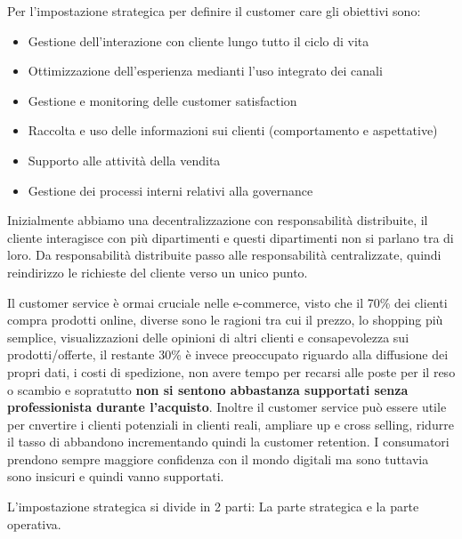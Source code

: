 \documentclass[11pt]{article}
\begin{document}
Per l'impostazione strategica per definire il customer care gli obiettivi sono:
\begin{itemize}[noitemsep,topsep=0ex]
	\item Gestione dell'interazione con cliente lungo tutto il ciclo di vita
	\item Ottimizzazione dell'esperienza medianti l'uso integrato dei canali
	\item Gestione e monitoring delle customer satisfaction
	\item Raccolta e uso delle informazioni sui clienti (comportamento e aspettative)
	\item Supporto alle attività della vendita
	\item Gestione dei processi interni relativi alla governance
\end{itemize}
Inizialmente abbiamo una decentralizzazione con responsabilità distribuite, il cliente interagisce con più dipartimenti e questi dipartimenti non si parlano tra di loro. 
Da responsabilità distribuite passo alle responsabilità centralizzate, quindi reindirizzo le richieste del cliente verso un unico punto.

Il customer service è ormai cruciale nelle e-commerce, visto che il 70\% dei clienti compra prodotti online, diverse sono le ragioni tra cui il prezzo, lo shopping più semplice, visualizzazioni delle opinioni di altri clienti e consapevolezza sui prodotti/offerte, il restante 30\% è invece preoccupato riguardo alla diffusione dei propri dati, i costi di spedizione, non avere tempo per recarsi alle poste per il reso o scambio e sopratutto \textbf{non si sentono abbastanza supportati senza professionista durante l'acquisto}.
Inoltre il customer service può essere utile per cnvertire i clienti potenziali in clienti reali, ampliare up e cross selling, ridurre il tasso di abbandono incrementando quindi la customer retention.
I consumatori prendono sempre maggiore confidenza con il mondo digitali ma sono tuttavia sono insicuri e quindi vanno supportati.

L'impostazione strategica si divide in 2 parti: La parte strategica e la parte operativa.
\end{document}
